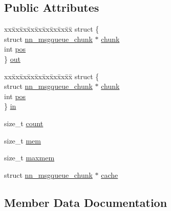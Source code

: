 \subsection*{Public Attributes}
\begin{DoxyCompactItemize}
\item 
\begin{tabbing}
xx\=xx\=xx\=xx\=xx\=xx\=xx\=xx\=xx\=\kill
struct \{\\
\>struct \hyperlink{structnn__msgqueue__chunk}{nn\_msgqueue\_chunk} $\ast$ \hyperlink{structnn__msgqueue_a57b0ce10a1e3ba159bb3e05e9e25ea57}{chunk}\\
\>int \hyperlink{structnn__msgqueue_a3714414d2aad4d30b34bc8c3bd865003}{pos}\\
\} \hyperlink{structnn__msgqueue_a752f1190a9edc8818dbb980ce7b849f3}{out}\\

\end{tabbing}\item 
\begin{tabbing}
xx\=xx\=xx\=xx\=xx\=xx\=xx\=xx\=xx\=\kill
struct \{\\
\>struct \hyperlink{structnn__msgqueue__chunk}{nn\_msgqueue\_chunk} $\ast$ \hyperlink{structnn__msgqueue_a57b0ce10a1e3ba159bb3e05e9e25ea57}{chunk}\\
\>int \hyperlink{structnn__msgqueue_a3714414d2aad4d30b34bc8c3bd865003}{pos}\\
\} \hyperlink{structnn__msgqueue_a86267100cce5ad85aa85a23c07a5cbf6}{in}\\

\end{tabbing}\item 
size\+\_\+t \hyperlink{structnn__msgqueue_aaa463916bbe4482be01ce84444383cfd}{count}
\item 
size\+\_\+t \hyperlink{structnn__msgqueue_afd34fe72790a56ba9d99681fd2024b6c}{mem}
\item 
size\+\_\+t \hyperlink{structnn__msgqueue_a1989a55354b0a334168696d9c1b3e29b}{maxmem}
\item 
struct \hyperlink{structnn__msgqueue__chunk}{nn\+\_\+msgqueue\+\_\+chunk} $\ast$ \hyperlink{structnn__msgqueue_a4e886b7d4c87b147648980f4af8befa3}{cache}
\end{DoxyCompactItemize}


\subsection{Member Data Documentation}
